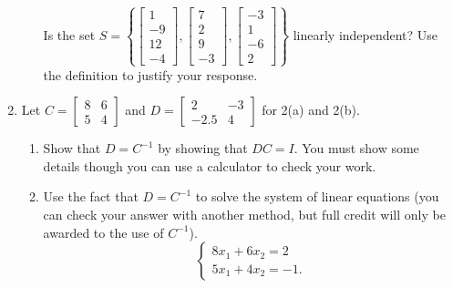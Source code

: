 \documentclass[basic]{inVerba-notes}
\begin{document}
\begin{enumerate}[align=left, leftmargin=0pt, labelindent=\parindent, listparindent=\parindent, labelwidth=0pt, itemindent=!]
\begin{enumerate}
    Is the set \(S=\left\{ \begin{bmatrix} 1 \\ -9 \\ 12\\-4 \end{bmatrix}, \begin{bmatrix} 7 \\ 2 \\ 9 \\ -3 \end{bmatrix}, \begin{bmatrix} -3 \\ 1 \\ -6 \\ 2 \end{bmatrix} \right\}\) linearly independent? Use the definition to justify your response.
  \end{enumerate}

  \newpage

  \item Let \(C=\begin{bmatrix}8 & 6\\5 & 4\end{bmatrix}\) and \(D=\begin{bmatrix}2 & -3\\-2.5 & 4\end{bmatrix}\) for 2(a) and 2(b).
  
  \begin{enumerate}
    \item {} Show that \(D=C^{-1}\) by showing that \(DC=I\). You must show some details though you can use a calculator to check your work.
    
    \newpage
    
    \item {} Use the fact that \(D=C^{-1}\) to solve the system of linear equations (you can check your answer with another method, but full credit will only be awarded to the use of \(C^{-1}\)).
    \[
    \begin{cases}
    8x_1+6x_2=2 \\
    5x_1+4x_2=-1.
    \end{cases}
    \]
  \end{enumerate}

  \newpage


\end{enumerate}
\end{document}
